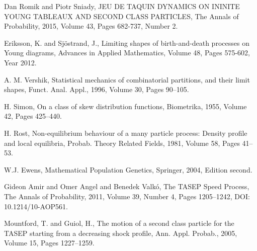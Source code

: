 \documentclass{math-mech-sci}
\begin{document}
\begin{thebibliography}{8}
 Dan Romik and Piotr Sniady, JEU DE TAQUIN DYNAMICS ON ININITE YOUNG TABLEAUX AND SECOND CLASS PARTICLES, The Annals of Probability, 2015, Volume 43, Pages 682-737, Number 2.

 Eriksson, K. and Sj\"ostrand, J., Limiting shapes of birth-and-death processes on {Y}oung diagrams, Advances in Applied Mathematics, Volume 48, Pages 575-602, Year 2012.

 A. M. Vershik, Statistical mechanics of combinatorial partitions, and their limit shapes, Funct. Anal. Appl., 1996, Volume 30, Pages 90--105.

 H. Simon, On a class of skew distribution functions, Biometrika, 1955, Volume 42, Pages 425--440.

 H. Rost, Non-equilibrium behaviour of a many particle process: Density profile and local equilibria, Probab. Theory Related Fields, 1981, Volume 58, Pages 41--53.

 W.J. Ewens, Mathematical Population Genetics, Springer, 2004, Edition second.

 Gideon Amir and Omer Angel and Benedek Valk\'o, The TASEP Speed Process, The Annals of Probability, 2011, Volume 39, Number 4, Pages 1205--1242, DOI: 10.1214/10-AOP561.

 Mountford, T. and Guiol, H., The motion of a second class particle for the TASEP starting from a decreasing shock profile, Ann. Appl. Probab., 2005, Volume 15, Pages 1227--1259.

\end{thebibliography}
\end{document}
